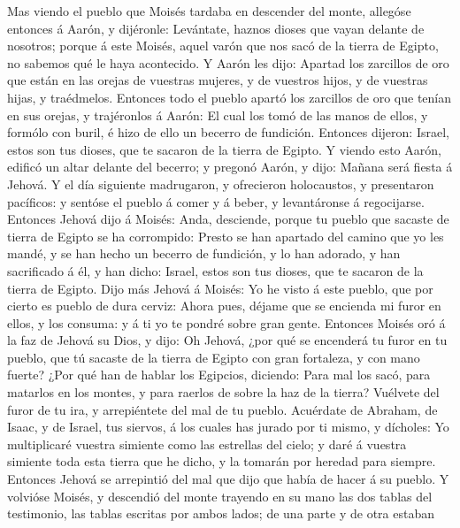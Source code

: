  Mas viendo el pueblo que Moisés tardaba en descender del
monte, allegóse entonces á Aarón, y dijéronle: Levántate, haznos dioses
que vayan delante de nosotros; porque á este Moisés, aquel varón que nos
sacó de la tierra de Egipto, no sabemos qué le haya acontecido.
 Y Aarón les dijo: Apartad los zarcillos de oro que están
en las orejas de vuestras mujeres, y de vuestros hijos, y de vuestras
hijas, y traédmelos.  Entonces todo el pueblo apartó los
zarcillos de oro que tenían en sus orejas, y trajéronlos á Aarón:
 El cual los tomó de las manos de ellos, y formólo con
buril, é hizo de ello un becerro de fundición. Entonces dijeron: Israel,
estos son tus dioses, que te sacaron de la tierra de Egipto.
 Y viendo esto Aarón, edificó un altar delante del
becerro; y pregonó Aarón, y dijo: Mañana será fiesta á Jehová.
 Y el día siguiente madrugaron, y ofrecieron holocaustos,
y presentaron pacíficos: y sentóse el pueblo á comer y á beber, y
levantáronse á regocijarse.  Entonces Jehová dijo á
Moisés: Anda, desciende, porque tu pueblo que sacaste de tierra de
Egipto se ha corrompido:  Presto se han apartado del
camino que yo les mandé, y se han hecho un becerro de fundición, y lo
han adorado, y han sacrificado á él, y han dicho: Israel, estos son tus
dioses, que te sacaron de la tierra de Egipto.  Dijo más
Jehová á Moisés: Yo he visto á este pueblo, que por cierto es pueblo de
dura cerviz:  Ahora pues, déjame que se encienda mi furor
en ellos, y los consuma: y á ti yo te pondré sobre gran gente.
 Entonces Moisés oró á la faz de Jehová su Dios, y dijo:
Oh Jehová, ¿por qué se encenderá tu furor en tu pueblo, que tú sacaste
de la tierra de Egipto con gran fortaleza, y con mano fuerte?
 ¿Por qué han de hablar los Egipcios, diciendo: Para mal
los sacó, para matarlos en los montes, y para raerlos de sobre la haz de
la tierra? Vuélvete del furor de tu ira, y arrepiéntete del mal de tu
pueblo.  Acuérdate de Abraham, de Isaac, y de Israel, tus
siervos, á los cuales has jurado por ti mismo, y dícholes: Yo
multiplicaré vuestra simiente como las estrellas del cielo; y daré á
vuestra simiente toda esta tierra que he dicho, y la tomarán por heredad
para siempre.  Entonces Jehová se arrepintió del mal que
dijo que había de hacer á su pueblo.  Y volvióse Moisés,
y descendió del monte trayendo en su mano las dos tablas del testimonio,
las tablas escritas por ambos lados; de una parte y de otra estaban
